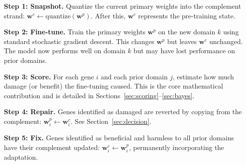 \documentclass[11pt,letterpaper]{article}
\theoremstyle{definition}
\begin{document}
\begin{center}
\end{center}

\textbf{Step 1: Snapshot.} Quantize the current primary weights into the complement strand: $\mathbf{w}^c \leftarrow \text{quantize}(\mathbf{w}^p)$. After this, $\mathbf{w}^c$ represents the pre-training state.

\textbf{Step 2: Fine-tune.} Train the primary weights $\mathbf{w}^p$ on the new domain $k$ using standard stochastic gradient descent. This changes $\mathbf{w}^p$ but leaves $\mathbf{w}^c$ unchanged. The model now performs well on domain $k$ but may have lost performance on prior domains.

\textbf{Step 3: Score.} For each gene $i$ and each prior domain $j$, estimate how much damage (or benefit) the fine-tuning caused. This is the core mathematical contribution and is detailed in Sections~\ref{sec:scoring}--\ref{sec:bayes}.

\textbf{Step 4: Repair.} Genes identified as damaged are reverted by copying from the complement: $\mathbf{w}^p_i \leftarrow \mathbf{w}^c_i$. See Section~\ref{sec:decision}.

\textbf{Step 5: Fix.} Genes identified as beneficial and harmless to all prior domains have their complement updated: $\mathbf{w}^c_i \leftarrow \mathbf{w}^p_i$, permanently incorporating the adaptation.
\end{document}
